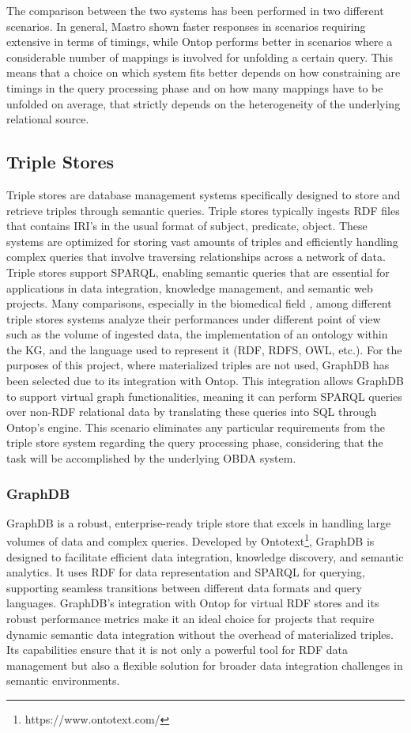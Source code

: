 The comparison between the two systems has been performed in two different scenarios. In general, Mastro shown faster responses in scenarios requiring extensive in terms of timings, while Ontop performs better in scenarios where a considerable number of mappings is involved for unfolding a certain query.
This means that a choice on which system fits better depends on how constraining are timings in the query processing phase and on how many mappings have to be unfolded on average, that strictly depends on the heterogeneity of the underlying relational source.

\subsection{Triple Stores}
Triple stores are database management systems specifically designed to store and retrieve triples through semantic queries. Triple stores typically ingests \ac{RDF} files that contains IRI's in the usual format of subject, predicate, object. These systems are optimized for storing vast amounts of triples and efficiently handling complex queries that involve traversing relationships across a network of data. Triple stores support SPARQL, enabling semantic queries that are essential for applications in data integration, knowledge management, and semantic web projects.
Many comparisons, especially in the biomedical field \cite{DBLP:journals/entropy/CanSBU17}, among different triple stores systems analyze their performances under different point of view such as the volume of ingested data, the implementation of an ontology within the \ac{KG}, and the language used to represent it (RDF, RDFS, OWL, etc.).
For the purposes of this project, where materialized triples are not used, GraphDB has been selected due to its integration with Ontop. This integration allows GraphDB to support virtual graph functionalities, meaning it can perform SPARQL queries over non-RDF relational data by translating these queries into SQL through Ontop's engine. This scenario eliminates any particular requirements from the triple store system regarding the query processing phase, considering that the task will be accomplished by the underlying OBDA system.

\subsubsection{GraphDB}
GraphDB is a robust, enterprise-ready triple store that excels in handling large volumes of data and complex queries. Developed by Ontotext\footnote{https://www.ontotext.com/}, GraphDB is designed to facilitate efficient data integration, knowledge discovery, and semantic analytics. It uses RDF for data representation and SPARQL for querying, supporting seamless transitions between different data formats and query languages.
GraphDB's integration with Ontop for virtual RDF stores and its robust performance metrics make it an ideal choice for projects that require dynamic semantic data integration without the overhead of materialized triples. Its capabilities ensure that it is not only a powerful tool for RDF data management but also a flexible solution for broader data integration challenges in semantic environments.